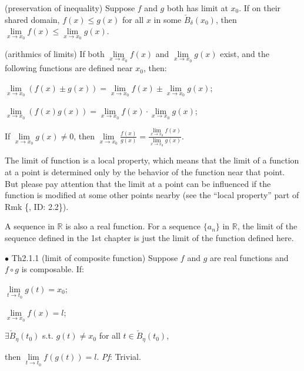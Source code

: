 \documentclass{article}
\begin{document}
\begin{Rmk}{}
{\begin{compactenum}
        \item (preservation of inequality) Suppose $f$ and $g$ both has limit at $x_0$. If on their shared domain, $f(x)\leq g(x)$ for all $x$ in some $\check{B}_\delta(x_0)$, then $\lim\limits_{x\to x_0} f(x) \leq \lim\limits_{x\to x_0} g(x)$.
        \item (arithmics of limits) If both $\lim\limits_{x\rightarrow x_0} f(x)$ and $\lim\limits_{x\rightarrow x_0} g(x)$ exist, and the following functions are defined near $x_0$, then:
        \begin{compactitem}
            \item $\lim\limits_{x\rightarrow x_0} (f(x)\pm g(x)) = \lim\limits_{x\rightarrow x_0} f(x) \pm \lim\limits_{x\rightarrow x_0} g(x)$;
            \item $\lim\limits_{x\rightarrow x_0} (f(x)g(x)) = \lim\limits_{x\rightarrow x_0} f(x) \cdot \lim\limits_{x\rightarrow x_0} g(x)$;
            \item If $\lim\limits_{x\rightarrow x_0} g(x)\neq 0$, then $\lim\limits_{x\rightarrow x_0} \frac{f(x)}{g(x)} = \frac{\lim\limits_{x\rightarrow x_0} f(x)}{\lim\limits_{x\rightarrow x_0} g(x)}$.
        \end{compactitem}
        \item The limit of function is a local property, which means that the limit of a function at a point is determined only by the behavior of the function near that point. But please pay attention that the limit at a point can be influenced if the function is modified at some other points nearby (see the ``local property'' part of Rmk \{, ID: 2.2\}).
        \item A sequence in $\mathbb{R}$ is also a real function. \textcolor{Th}{For a sequence $\{a_n\}$ in $\mathbb{R}$, the limit of the sequence defined in the 1st chapter is just the limit of the function defined here.}
    \end{compactenum}}
\end{Rmk}

\begin{Th}{$\bullet$ Th2.1.1 (limit of composite function)}
    Suppose $f$ and $g$ are real functions and $f\circ g$ is composable. If:
    \begin{compactenum}
        \item $\lim\limits_{t\rightarrow t_0} g(t) = x_0$;
        \item $\lim\limits_{x\rightarrow x_0} f(x) = l$;
        \item $\exists \check{B}_\eta(t_0)$ s.t. $g(t)\neq x_0$ for all $t\in\check{B}_\eta(t_0)$,
    \end{compactenum}
    then $\lim\limits_{t\rightarrow t_0} f(g(t)) = l$.
    \tcblower
    \textit{Pf}: Trivial.
\end{Th}
\end{document}
